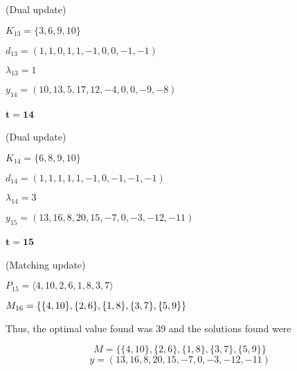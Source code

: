 \documentclass[a4paper,10pt, leqno]{article}
\theoremstyle{definition}
\begin{document}
(Dual update)

$K_{13} = \{ 3, 6, 9, 10 \}$

$d_{13} = (1, 1, 0, 1, 1, -1, 0, 0, -1, -1)$

$\lambda_{13} = 1$

$y_{14} = (10, 13, 5, 17, 12, -4, 0, 0, -9, -8)$

\paragraph{$\mathbf{t = 14}$}

(Dual update)

$K_{14} = \{ 6, 8, 9, 10 \}$

$d_{14} = (1, 1, 1, 1, 1, -1, 0, -1, -1, -1)$

$\lambda_{14} = 3$

$y_{15} = (13, 16, 8, 20, 15, -7, 0, -3, -12, -11)$

\paragraph{$\mathbf{t = 15}$}

(Matching update)

$P_{15} = \langle 4, 10, 2, 6, 1, 8, 3, 7 \rangle$ 

$M_{16} = \{\{4, 10\}, \{2, 6\}, \{1, 8\}, \{3, 7\}, \{5, 9\}\} \\$


Thus, the optimal value found was 39 and the solutions found were 

$$
M = \{\{4, 10\}, \{2, 6\}, \{1, 8\}, \{3, 7\}, \{5, 9\}\}
$$
$$
y = (13, 16, 8, 20, 15, -7, 0, -3, -12, -11)
$$
\end{document}
